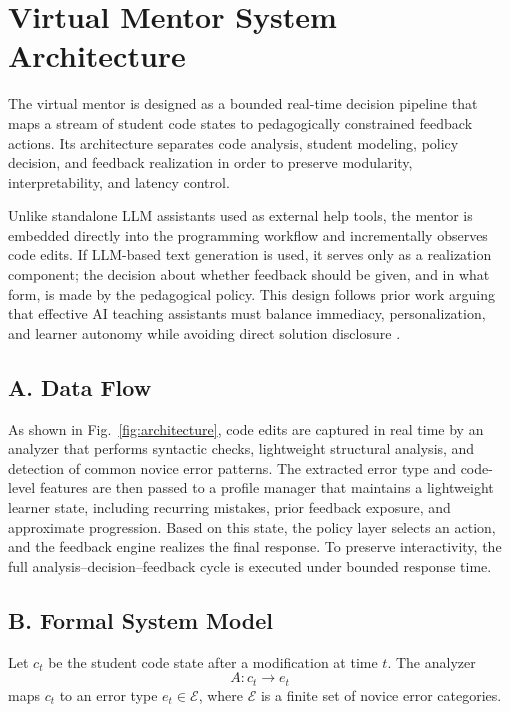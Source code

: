 \documentclass[conference]{IEEEtran}
\begin{document}
\section{Virtual Mentor System Architecture}

The virtual mentor is designed as a bounded real-time decision pipeline that maps a stream of student code states to pedagogically constrained feedback actions. Its architecture separates code analysis, student modeling, policy decision, and feedback realization in order to preserve modularity, interpretability, and latency control.

Unlike standalone LLM assistants used as external help tools, the mentor is embedded directly into the programming workflow and incrementally observes code edits. If LLM-based text generation is used, it serves only as a realization component; the decision about whether feedback should be given, and in what form, is made by the pedagogical policy. This design follows prior work arguing that effective AI teaching assistants must balance immediacy, personalization, and learner autonomy while avoiding direct solution disclosure \cite{DesirableCharacteristicsforAITeachingAssistantsinProgrammingEducation,CodeAid}.

\subsection*{A. Data Flow}

As shown in Fig.~\ref{fig:architecture}, code edits are captured in real time by an analyzer that performs syntactic checks, lightweight structural analysis, and detection of common novice error patterns. The extracted error type and code-level features are then passed to a profile manager that maintains a lightweight learner state, including recurring mistakes, prior feedback exposure, and approximate progression. Based on this state, the policy layer selects an action, and the feedback engine realizes the final response. To preserve interactivity, the full analysis--decision--feedback cycle is executed under bounded response time.

\subsection*{B. Formal System Model}

Let $c_t$ be the student code state after a modification at time $t$. The analyzer
\[
A: c_t \rightarrow e_t
\]
maps $c_t$ to an error type $e_t \in \mathcal{E}$, where $\mathcal{E}$ is a finite set of novice error categories.
\end{document}

